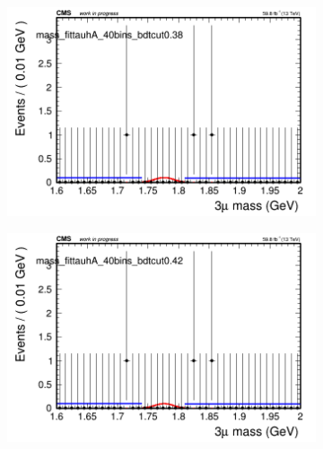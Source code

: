 \begin{figure}[H]
\begin{subfigure}{0.2\textwidth}
        \caption{}
    \end{subfigure}
    \begin{subfigure}{0.2\textwidth}
        \includegraphics[width=\textwidth]{unfixed_exp/plots/tauhA/massfit_tauhA_40bins_bdtcut0.38.png}
        \caption{}
    \end{subfigure}
    \begin{subfigure}{0.2\textwidth}
        \includegraphics[width=\textwidth]{unfixed_exp/plots/tauhA/massfit_tauhA_40bins_bdtcut0.42.png}
        \caption{}
    \end{subfigure}
    \begin{subfigure}{0.2\textwidth}

\end{subfigure}
\end{figure}
